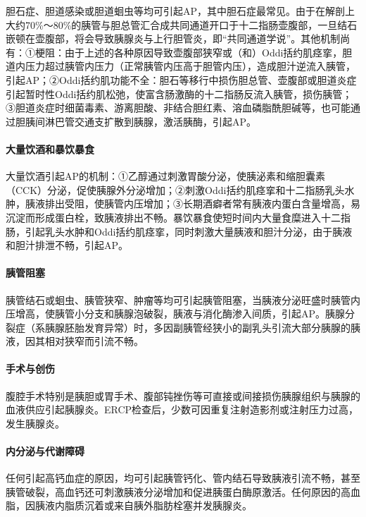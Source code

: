 胆石症、胆道感染或胆道蛔虫等均可引起AP，其中胆石症最常见。由于在解剖上大约70\%～80\%的胰管与胆总管汇合成共同通道开口于十二指肠壶腹部，一旦结石嵌顿在壶腹部，将会导致胰腺炎与上行胆管炎，即“共同通道学说”。其他机制尚有：①梗阻：由于上述的各种原因导致壶腹部狭窄或（和）Oddi括约肌痉挛，胆道内压力超过胰管内压力（正常胰管内压高于胆管内压），造成胆汁逆流入胰管，引起AP；②Oddi括约肌功能不全：胆石等移行中损伤胆总管、壶腹部或胆道炎症引起暂时性Oddi括约肌松弛，使富含肠激酶的十二指肠反流入胰管，损伤胰管；③胆道炎症时细菌毒素、游离胆酸、非结合胆红素、溶血磷脂酰胆碱等，也可能通过胆胰间淋巴管交通支扩散到胰腺，激活胰酶，引起AP。

\paragraph{大量饮酒和暴饮暴食}

大量饮酒引起AP的机制：①乙醇通过刺激胃酸分泌，使胰泌素和缩胆囊素（CCK）分泌，促使胰腺外分泌增加；②刺激Oddi括约肌痉挛和十二指肠乳头水肿，胰液排出受阻，使胰管内压增加；③长期酒癖者常有胰液内蛋白含量增高，易沉淀而形成蛋白栓，致胰液排出不畅。暴饮暴食使短时间内大量食糜进入十二指肠，引起乳头水肿和Oddi括约肌痉挛，同时刺激大量胰液和胆汁分泌，由于胰液和胆汁排泄不畅，引起AP。

\paragraph{胰管阻塞}

胰管结石或蛔虫、胰管狭窄、肿瘤等均可引起胰管阻塞，当胰液分泌旺盛时胰管内压增高，使胰管小分支和胰腺泡破裂，胰液与消化酶渗入间质，引起AP。胰腺分裂症（系胰腺胚胎发育异常）时，多因副胰管经狭小的副乳头引流大部分胰腺的胰液，因其相对狭窄而引流不畅。

\paragraph{手术与创伤}

腹腔手术特别是胰胆或胃手术、腹部钝挫伤等可直接或间接损伤胰腺组织与胰腺的血液供应引起胰腺炎。ERCP检查后，少数可因重复注射造影剂或注射压力过高，发生胰腺炎。

\paragraph{内分泌与代谢障碍}

任何引起高钙血症的原因，均可引起胰管钙化、管内结石导致胰液引流不畅，甚至胰管破裂，高血钙还可刺激胰液分泌增加和促进胰蛋白酶原激活。任何原因的高血脂，因胰液内脂质沉着或来自胰外脂肪栓塞并发胰腺炎。

